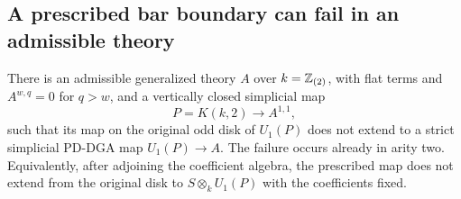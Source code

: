 \subsection{A prescribed bar boundary can fail in an admissible theory}

\begin{proposition}
\label{sa08:C31}
There is an admissible generalized theory $A$ over $k=\mathbb Z_{(2)}$,
with flat terms and $A^{w,q}=0$ for $q>w$, and a vertically closed
simplicial map
\[
 P=K(k,2)\longrightarrow A^{1,1},
\]
such that its map on the original odd disk of $U_1(P)$ does not
extend to a strict simplicial PD-DGA map $U_1(P)\to A$.
The failure occurs already in arity two. Equivalently, after adjoining
the coefficient algebra, the prescribed map does not extend from the
original disk to $S\otimes_k U_1(P)$ with the coefficients fixed.
\end{proposition}

